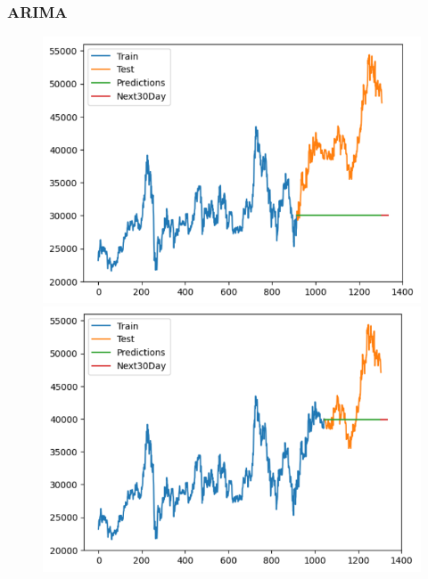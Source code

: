 \subsubsection{ARIMA}
\begin{figure}[H]
    \centering
    \begin{minipage}{0.15\textwidth}
    \centering
    \includegraphics[width=1\textwidth]{resources/chapter-5/newdata/result/BIDV_ARIMA_7-3.png}
    \end{minipage}
    \hfill
    \begin{minipage}{0.15\textwidth}
    \centering
    \includegraphics[width=1\textwidth]{resources/chapter-5/newdata/result/BIDV_ARIMA_8-2.png}
    \end{minipage}
    \hfill
        \begin{minipage}{0.15\textwidth}

\end{minipage}
\end{figure}
